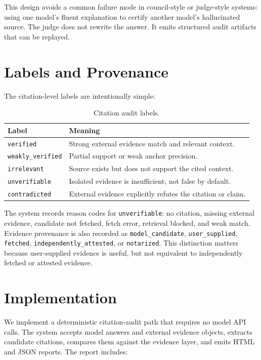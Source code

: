 \documentclass[11pt]{article}
\begin{document}
This design avoids a common failure mode in council-style or judge-style systems: using one model's fluent explanation to certify another model's hallucinated source. The judge does not rewrite the answer. It emits structured audit artifacts that can be replayed.

\section{Labels and Provenance}

The citation-level labels are intentionally simple:

\begin{table}[h]
\centering
\small
\begin{tabularx}{\columnwidth}{lX}
\toprule
Label & Meaning \\
\midrule
\texttt{verified} & Strong external evidence match and relevant context. \\
\texttt{weakly\_verified} & Partial support or weak anchor precision. \\
\texttt{irrelevant} & Source exists but does not support the cited context. \\
\texttt{unverifiable} & Isolated evidence is insufficient; not false by default. \\
\texttt{contradicted} & External evidence explicitly refutes the citation or claim. \\
\bottomrule
\end{tabularx}
\caption{Citation audit labels.}
\label{tab:labels}
\end{table}

The system records reason codes for \texttt{unverifiable}: no citation, missing external evidence, candidate not fetched, fetch error, retrieval blocked, and weak match. Evidence provenance is also recorded as \texttt{model\_candidate}, \texttt{user\_supplied}, \texttt{fetched}, \texttt{independently\_attested}, or \texttt{notarized}. This distinction matters because user-supplied evidence is useful, but not equivalent to independently fetched or attested evidence.

\section{Implementation}

We implement a deterministic citation-audit path that requires no model API calls. The system accepts model answers and external evidence objects, extracts candidate citations, compares them against the evidence layer, and emits HTML and JSON reports. The report includes:
\end{document}
